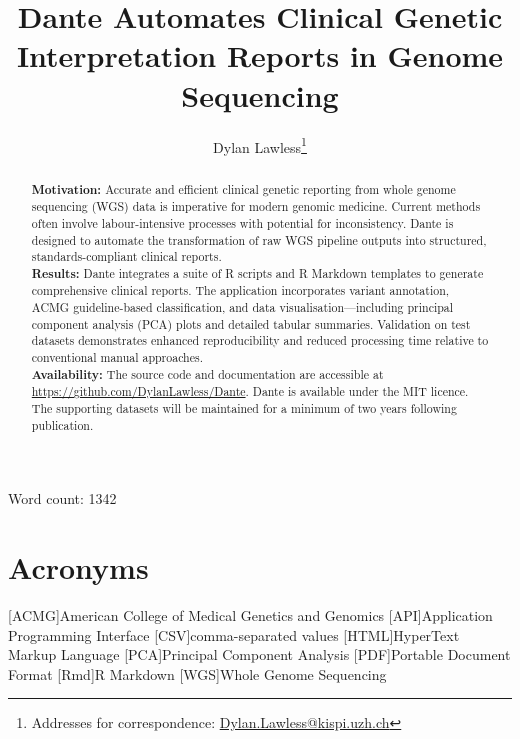 
\usepackage[printonlyused,withpage,nohyperlinks]{acronym}
 

\title{Dante Automates Clinical Genetic Interpretation Reports in Genome Sequencing}	

\author[1]{Dylan Lawless\thanks{Addresses for correspondence: \href{mailto:Dylan.Lawless@kispi.uzh.ch}{Dylan.Lawless@kispi.uzh.ch}}}


\maketitle
\justify

Word count: 1342

\begin{abstract}
\noindent \textbf{Motivation:} Accurate and efficient clinical genetic reporting from whole genome sequencing (WGS) data is imperative for modern genomic medicine. Current methods often involve labour-intensive processes with potential for inconsistency. Dante is designed to automate the transformation of raw WGS pipeline outputs into structured, standards-compliant clinical reports.\\[1ex]
\noindent \textbf{Results:}  Dante integrates a suite of R scripts and R Markdown templates to generate comprehensive clinical reports. The application incorporates variant annotation, ACMG guideline-based classification, and data visualisation—including principal component analysis (PCA) plots and detailed tabular summaries. Validation on test datasets demonstrates enhanced reproducibility and reduced processing time relative to conventional manual approaches.\\[1ex]
\noindent \textbf{Availability:}  The source code and documentation are accessible at \url{https://github.com/DylanLawless/Dante}. Dante is available under the MIT licence. The supporting datasets will be maintained for a minimum of two years following publication.
\end{abstract}
\clearpage

\section*{Acronyms}
\renewenvironment{description} %
{\list{}{\labelwidth0pt\itemindent-\leftmargin
    \parsep-1em\itemsep0pt\let\makelabel\descriptionlabel}}
               {\endlist}
\begin{acronym} 
[ACMG]{American College of Medical Genetics and Genomics}
[API]{Application Programming Interface}
[CSV]{comma-separated values}
[HTML]{HyperText Markup Language}
[PCA]{Principal Component Analysis}
[PDF]{Portable Document Format}
[Rmd]{R Markdown}
[WGS]{Whole Genome Sequencing}
\end{acronym} 

